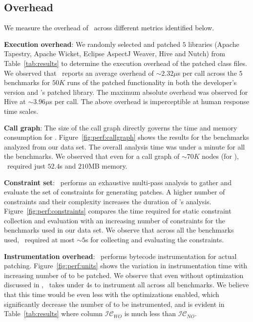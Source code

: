 \subsection{Overhead}
\label{sub:overhead}

We measure the overhead of \tool\ across different metrics identified below.

\begin{mylist}

 \item \textbf{Execution overhead}: We randomly selected and patched $5$
libraries (Apache Tapestry, Apache Wicket, Eclipse AspectJ Weaver, Hive and
Nutch) from Table~\ref{tab:results} to determine the execution overhead of the
patched class files. We observed that \tool\ reports an average overhead of
$\sim$$2.32\mu$s per call across the $5$ benchmarks for $50K$ runs of the
patched functionality in both the developer's version and \tool's patched
library. The maximum absolute overhead was observed for Hive at $\sim$$3.96\mu$s
per call. The above overhead is imperceptible at human response time scales.

 \item \textbf{Call graph}: The size of the call graph directly governs the time
and memory consumption for \tool. Figure~\ref{fig:perf:callgraph} shows the
results for the benchmarks analyzed from our data set. The overall analysis
time was under a minute for all the benchmarks. We observed that even for a call
graph of $\sim$$70K$ nodes (for ), \tool\ required just $52.4$s
and $210$MB memory.

 \item \textbf{Constraint set}: \tool\ performs an exhaustive multi-pass
analysis to gather and evaluate the set of constraints for generating patches. A
higher number of constraints and their complexity increases the duration of
\tool's analysis. Figure~\ref{fig:perf:constraints} compares the time required
for static constraint collection and evaluation with an increasing number of
constraints for the benchmarks used in our data set. We observe that across
all the benchmarks used, \tool\ required at most $\sim$$5$s for collecting and
evaluating the constraints.

\item \textbf{Instrumentation overhead}: \tool\ performs bytecode
instrumentation for actual patching. Figure~\ref{fig:perf:units} shows the
variation in instrumentation time with increasing number of  to be
patched. We observe that even without optimization discussed in
, \tool\ takes under $4$s to instrument all
 across all benchmarks. We believe that this time would be even
less with the optimizations enabled, which significantly decrease the number of
 to be instrumented, and is evident in Table~\ref{tab:results} where
column $\mathcal{IC}_{WO}$ is much less than $\mathcal{IC}_{NO}$.

\end{mylist}

